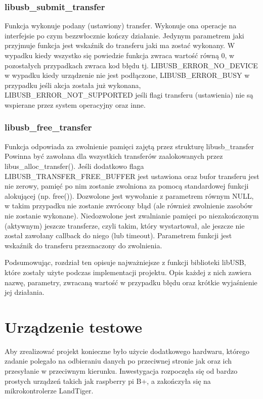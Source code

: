 \documentclass{BscUS}
\begin{document}
\subsection{libusb\_submit\_transfer}
\noindent Funkcja wykonuje podany (ustawiony) transfer.
Wykonuje ona operacje na interfejsie po czym bezzwłocznie kończy działanie.
Jedynym parametrem jaki przyjmuje funkcja jest wskaźnik do transferu jaki ma zostać wykonany.
\newline
W wypadku kiedy wszystko się powiedzie funkcja zwraca wartość równą 0, w pozostałych przypadkach zwraca kod błędu tj. LIBUSB\_ERROR\_NO\_DEVICE w wypadku kiedy urządzenie nie jest podłączone, LIBUSB\_ERROR\_BUSY w przypadku jeśli akcja została już wykonana, LIBUSB\_ERROR\_NOT\_SUPPORTED jeśli flagi transferu (ustawienia) nie są wspierane przez system operacyjny oraz inne.
\subsection{libusb\_free\_transfer}
\noindent Funkcja odpowiada za zwolnienie pamięci zajętą przez strukturę libusb\_transfer
Powinna być zawołana dla wszystkich transferów zaalokowanych przez libus\_alloc\_transfer().
Jeśli dodatkowo flaga LIBUSB\_TRANSFER\_FREE\_BUFFER jest ustawiona oraz bufor transferu jest nie zerowy, pamięć po nim zostanie zwolniona za pomocą standardowej funkcji alokującej (np. free()).
Dozwolone jest wywołanie z parametrem równym NULL, w takim przypadku nie zostanie zwrócony błąd (ale również zwolnienie zasobów nie zostanie wykonane).
Niedozwolone jest zwalnianie pamięci po niezakończonym (aktywnym) jeszcze transferze, czyli takim, który wystartował, ale jeszcze nie został zawołany callback do niego (lub timeout).
Parametrem funkcji jest wskaźnik do transferu przeznaczony do zwolnienia.
\newline

\indent Podsumowując, rozdział ten opisuje najważniejsze z funkcji biblioteki libUSB, które zostały użyte podczas implementacji projektu. Opis każdej z nich zawiera nazwę, parametry, zwracaną wartość w przypadku błędu oraz krótkie wyjaśnienie jej działania.
\chapter{Urządzenie testowe}
\label{microcontrollerChapter}
Aby zrealizować projekt konieczne było użycie dodatkowego hardwaru, którego zadanie polegało na odbieraniu danych po przeciwnej stronie jak oraz ich przesyłanie w przeciwnym kierunku. Inwestygacja rozpoczęła się od bardzo prostych urządzeń takich jak raspberry pi B+, a zakończyła się na mikrokontrolerze LandTiger.
\end{document}
